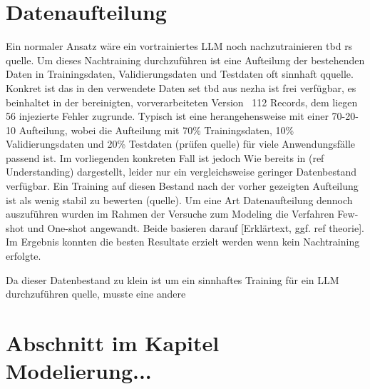 \section{Datenaufteilung}
Ein normaler Ansatz wäre ein vortrainiertes LLM noch nachzutrainieren tbd rs quelle. Um dieses Nachtraining durchzuführen ist eine Aufteilung der bestehenden Daten in Trainingsdaten, Validierungsdaten und Testdaten oft sinnhaft qquelle. Konkret ist das in den verwendete Daten set tbd aus nezha ist frei verfügbar, es beinhaltet in der bereinigten, vorverarbeiteten Version ~112 Records, dem liegen 56 injezierte Fehler zugrunde. Typisch ist eine herangehensweise mit einer 70-20-10 Aufteilung, wobei die Aufteilung mit 70\% Trainingsdaten, 10\% Validierungsdaten und  20\% Testdaten (prüfen quelle) für viele Anwendungsfälle passend ist. Im vorliegenden konkreten Fall ist jedoch Wie bereits in  (ref Understanding) dargestellt, leider nur ein vergleichsweise geringer Datenbestand verfügbar. Ein Training auf diesen Bestand nach der vorher gezeigten Aufteilung ist als wenig stabil zu bewerten (quelle). Um eine Art Datenaufteilung dennoch auszuführen wurden im Rahmen der Versuche zum Modeling die Verfahren Few-shot und One-shot angewandt. Beide basieren darauf [Erklärtext, ggf. ref theorie]. Im Ergebnis konnten die besten Resultate erzielt werden wenn kein Nachtraining erfolgte.


Da dieser Datenbestand zu klein ist um ein sinnhaftes Training für ein LLM durchzuführen quelle, musste eine andere 

\section{Abschnitt im Kapitel Modelierung...}